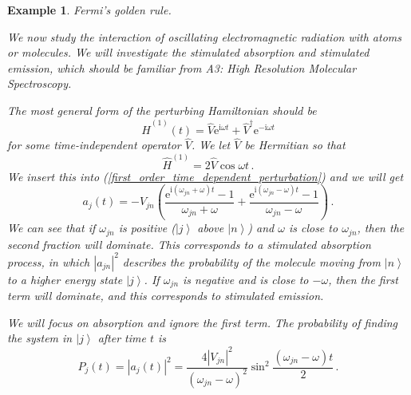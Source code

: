 \documentclass{article}
\theoremstyle{plain}\theoremheaderfont{\normalfont\itshape}\theorembodyfont{\rmfamily}\theoremseparator{.}\newtheorem*{rem}{Remark}\newtheorem*{ex}{Example}\newtheorem*{proof}{Proof}\newtheorem*{altp}{Alternative proof}
\theoremstyle{plain}\theoremheaderfont{\normalfont\bfseries}\theorembodyfont{\rmfamily}\theoremseparator{.}\newtheorem{thm}{Theorem}[section]\newtheorem{lem}[thm]{Lemma}\newtheorem{prop}[thm]{Proposition}\newtheorem*{cor}{Corollary}\newtheorem{defn}[thm]{Definition}\newtheorem{clm}[thm]{Claim}\newtheorem{clminproof}{Claim}
\theoremstyle{break}\theoremheaderfont{\normalfont\itshape}\theorembodyfont{\rmfamily}\theoremseparator{.\medskip}\newtheorem*{proofskip}{Proof}\newtheorem*{exs}{Examples}\newtheorem*{rems}{Remarks}
\theoremstyle{break}\theoremheaderfont{\normalfont\bfseries}\theorembodyfont{\rmfamily}\theoremseparator{.\medskip}\newtheorem{lemskip}[thm]{Lemma}\newtheorem{defnskip}[thm]{Definition}\newtheorem{propskip}[thm]{Proposition}\newtheorem{thmskip}[thm]{Theorem}
\numberwithin{equation}{section}
\newcommand{\ii}{\mathrm{i}}
\newcommand{\ee}{\mathrm{e}}
\newcommand{\ket}[1]{\left| #1 \right\rangle}
\newcommand{\abs}[1]{\left| #1 \right|}
\begin{document}
    \begin{ex}
        \textit{Fermi's golden rule.}

        We now study the interaction of oscillating electromagnetic radiation with atoms or molecules. We will investigate the stimulated absorption and stimulated emission, which should be familiar from \textit{A3: High Resolution Molecular Spectroscopy}.

        The most general form of the perturbing Hamiltonian should be
        \begin{equation}
            \hat{H}^{(1)}(t)=\hat{V} \ee^{\ii\omega t}+\hat{V}^\dagger \ee^{-\ii\omega t}
        \end{equation}
        for some time-independent operator \(\hat{V}\). We let \(\hat{V}\) be Hermitian so that
        \begin{equation}\label{EM_Wave_Hamiltonian}
            \hat{H}^{(1)}=2\hat{V}\cos\omega t\,.
        \end{equation}
        We insert this into (\ref{first_order_time_dependent_perturbation}) and we will get
        \begin{equation}
            a_j(t)=-V_{jn}\left(\frac{\ee^{\ii(\omega_{jn}+\omega)t}-1}{\omega_{jn}+\omega}+\frac{\ee^{\ii(\omega_{jn}-\omega)t}-1}{\omega_{jn}-\omega}\right)\,.
        \end{equation}
        We can see that if \(\omega_{jn}\) is positive (\(\ket{j}\) above \(\ket{n}\)) and \(\omega\) is close to \(\omega_{jn}\), then the second fraction will dominate. This corresponds to a \textit{stimulated absorption} process, in which \(\abs{a_{jn}}^2\) describes the probability of the molecule moving from \(\ket{n}\) to a higher energy state \(\ket{j}\). If \(\omega_{jn}\) is negative and is close to \(-\omega\), then the first term will dominate, and this corresponds to \textit{stimulated emission}.

        We will focus on absorption and ignore the first term. The probability of finding the system in \(\ket{j}\) after time \(t\) is
        \begin{equation}\label{EM_transition_prob}
            P_j(t)=\abs{a_j(t)}^2=\frac{4\abs{V_{jn}}^2}{(\omega_{jn}-\omega)^2}\sin^2\frac{(\omega_{jn}-\omega)t}{2}\,.
        \end{equation}


\end{ex}
\end{document}
